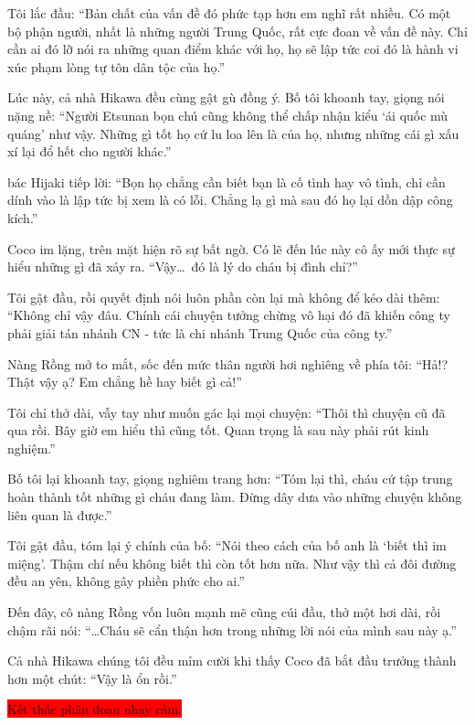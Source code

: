 \documentclass[../main.tex]{subfiles}
\begin{document}
Tôi lắc đầu: ``Bản chất của vấn đề đó phức tạp hơn em nghĩ rất nhiều. Có một bộ phận người, nhất là những người Trung Quốc, rất cực đoan về vấn đề này. Chỉ cần ai đó lỡ nói ra những quan điểm khác với họ, họ sẽ lập tức coi đó là hành vi xúc phạm lòng tự tôn dân tộc của họ.''

Lúc này, cả nhà Hikawa đều cùng gật gù đồng ý. Bố tôi khoanh tay, giọng nói nặng nề: ``Người Etsunan bọn chú cũng không thể chấp nhận kiểu `ái quốc mù quáng' như vậy. Những gì tốt họ cứ lu loa lên là của họ, nhưng những cái gì xấu xí lại đổ hết cho người khác.''

bác Hijaki tiếp lời: ``Bọn họ chẳng cần biết bạn là cố tình hay vô tình, chỉ cần dính vào là lập tức bị xem là có lỗi. Chẳng lạ gì mà sau đó họ lại dồn dập công kích.''

Coco im lặng, trên mặt hiện rõ sự bất ngờ. Có lẽ đến lúc này cô ấy mới thực sự hiểu những gì đã xảy ra. ``Vậy\dots\ đó là lý do cháu bị đình chỉ?''

Tôi gật đầu, rồi quyết định nói luôn phần còn lại mà không để kéo dài thêm: ``Không chỉ vậy đâu. Chính cái chuyện tưởng chừng vô hại đó đã khiến công ty phải giải tán nhánh CN - tức là chi nhánh Trung Quốc của công ty.''

Nàng Rồng mở to mắt, sốc đến mức thân người hơi nghiêng về phía tôi: ``Hả!? Thật vậy ạ? Em chẳng hề hay biết gì cả!''

Tôi chỉ thở dài, vẫy tay như muốn gác lại mọi chuyện: ``Thôi thì chuyện cũ đã qua rồi. Bây giờ em hiểu thì cũng tốt. Quan trọng là sau này phải rút kinh nghiệm.''

Bố tôi lại khoanh tay, giọng nghiêm trang hơn: ``Tóm lại thì, cháu cứ tập trung hoàn thành tốt những gì cháu đang làm. Đừng dây dưa vào những chuyện không liên quan là được.''

Tôi gật đầu, tóm lại ý chính của bố: ``Nói theo cách của bố anh là `biết thì im miệng'. Thậm chí nếu không biết thì còn tốt hơn nữa. Như vậy thì cả đôi đường đều an yên, không gây phiền phức cho ai.''

Đến đây, cô nàng Rồng vốn luôn mạnh mẽ cũng cúi đầu, thở một hơi dài, rồi chậm rãi nói: ``\dots Cháu sẽ cẩn thận hơn trong những lời nói của mình sau này ạ.''

Cả nhà Hikawa chúng tôi đều mỉm cười khi thấy Coco đã bắt đầu trưởng thành hơn một chút: ``Vậy là ổn rồi.''

\begin{center}
  \colorbox{red}{\color{white} Kết thúc phân đoạn nhạy cảm.}
\end{center}
\end{document}
